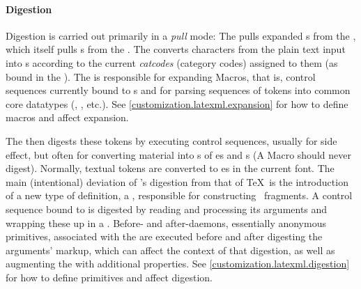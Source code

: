 \documentclass{book}
\begin{document}
\paragraph{Digestion}\label{architecture.latexml..digestion}
%
%
%
%
%
%
%
%
%
%
%

Digestion is carried out primarily in a \emph{pull} mode: The 
pulls expanded s from the , which itself pulls s from 
the .  The  converts characters from the plain text input
into s according to the current \emph{catcodes} (category codes) assigned to
them (as bound in the ).  
The  is responsible for expanding Macros,
that is, control sequences currently bound to s
and for parsing sequences of tokens into common core datatypes
(, , etc.).
See \ref{customization.latexml.expansion} for how to define macros
and affect expansion.

The  then digests these tokens by executing  control 
sequences, usually for side effect, but often for converting material
into s of es and s
(A Macro should never digest).
Normally, textual tokens are converted to es in the current font.
The main (intentional) deviation of \LaTeXML's digestion from that of \TeX\ is
the introduction of a new type of definition, a ,
responsible for constructing \XML\ fragments.
A control sequence bound to  is digested by
reading and processing its arguments and wrapping these up in a .
Before- and after-daemons, essentially anonymous primitives, associated with
the  are executed before and after digesting the 
arguments' markup, which can affect the context of that digestion, as well
as augmenting the  with additional properties.
See \ref{customization.latexml.digestion} for how to define primitives
and affect digestion.
\end{document}
